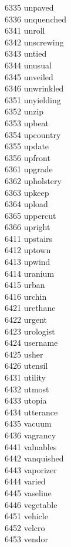 6335 unpaved \\
6336 unquenched \\
6341 unroll \\
6342 unscrewing \\
6343 untied \\
6344 unusual \\
6345 unveiled \\
6346 unwrinkled \\
6351 unyielding \\
6352 unzip \\
6353 upbeat \\
6354 upcountry \\
6355 update \\
6356 upfront \\
6361 upgrade \\
6362 upholstery \\
6363 upkeep \\
6364 upload \\
6365 uppercut \\
6366 upright \\
6411 upstairs \\
6412 uptown \\
6413 upwind \\
6414 uranium \\
6415 urban \\
6416 urchin \\
6421 urethane \\
6422 urgent \\
6423 urologist \\
6424 username \\
6425 usher \\
6426 utensil \\
6431 utility \\
6432 utmost \\
6433 utopia \\
6434 utterance \\
6435 vacuum \\
6436 vagrancy \\
6441 valuables \\
6442 vanquished \\
6443 vaporizer \\
6444 varied \\
6445 vaseline \\
6446 vegetable \\
6451 vehicle \\
6452 velcro \\
6453 vendor \columnbreak \\
